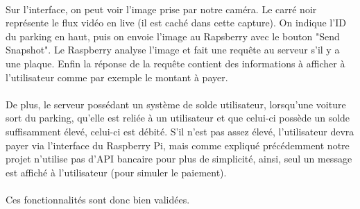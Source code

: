 \paragraph*{}
Sur l'interface, on peut voir l'image prise par notre caméra. Le carré noir représente le flux vidéo en live (il est caché dans cette capture).
On indique l'ID du parking en haut, puis on envoie l'image au Rapsberry avec le bouton "Send Snapshot". Le Raspberry analyse l'image et fait une requête au serveur s'il y a une plaque. Enfin la réponse de la requête contient des informations à afficher à l'utilisateur comme par exemple le montant à payer.


\paragraph*{}
De plus, le serveur possédant un système de solde utilisateur, lorsqu'une voiture sort du parking, qu'elle est reliée à un utilisateur et que celui-ci possède un solde suffisamment élevé, celui-ci est débité. S'il n'est pas assez élevé, l'utilisateur devra payer via l'interface du Raspberry Pi, mais comme expliqué précédemment notre projet n'utilise pas d'API bancaire pour plus de simplicité, ainsi, seul un message est affiché à l'utilisateur (pour simuler le paiement).

\paragraph*{}
Ces fonctionnalités sont donc bien validées.
